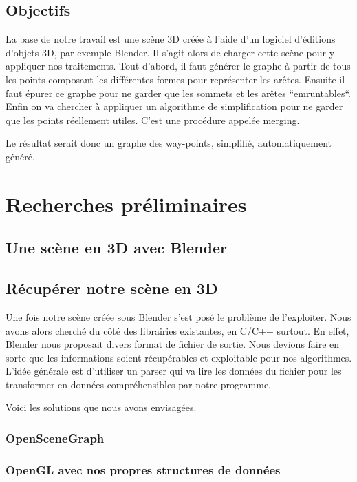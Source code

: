 \documentclass[a4paper,12pt]{report}
\begin{document}
\section*{Objectifs}

La base de notre travail est une scène 3D créée à l'aide d'un logiciel d'éditions d'objets 3D, par exemple Blender. Il s'agit alors de charger cette scène pour y appliquer nos traitements. Tout d'abord, il faut générer le graphe à partir de tous les points composant les différentes formes pour représenter les arêtes. Ensuite il faut épurer ce graphe pour ne garder que les sommets et les arêtes ``emruntables``. Enfin on va chercher à appliquer un algorithme de simplification pour ne garder que les points réellement utiles. C'est une procédure appelée merging.

Le résultat serait donc un graphe des way-points, simplifié, automatiquement généré.

\newpage

\chapter{Recherches préliminaires}

\section{Une scène en 3D avec Blender}

\section{Récupérer notre scène en 3D}
 
Une fois notre scène créée sous Blender s'est posé le problème de l'exploiter. Nous avons alors cherché du côté des librairies existantes, en C/C++ surtout. En effet, Blender nous proposait divers format de fichier de sortie. Nous devions faire en sorte que les informations soient récupérables et exploitable pour nos algorithmes. L'idée générale est d'utiliser un parser qui va lire les données du fichier pour les transformer en données compréhensibles par notre programme.

Voici les solutions que nous avons envisagées.
 
\subsection{OpenSceneGraph}

\subsection{OpenGL avec nos propres structures de données}
\end{document}
